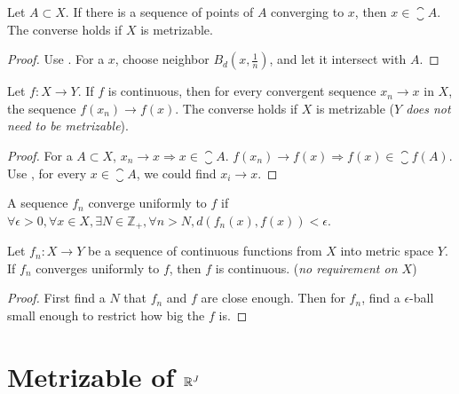 \begin{theorem}\label{sequence_lemma}
    Let $A \subset X$. If there is a sequence of points of $A$ converging to $x$, then $x \in \closure{A}$. The converse holds if $X$ is metrizable.
\end{theorem}
\begin{proof}
    Use . For a $x$, choose neighbor $B_d(x, \frac{1}{n})$, and let it intersect with $A$.
\end{proof}


\begin{theorem}
    Let $f: X \rightarrow Y$. If $f$ is continuous, then for every convergent sequence $x_n \rightarrow x$ in $X$, the sequence $f(x_n) \rightarrow f(x)$. The converse holds if $X$ is metrizable (\emph{$Y$ does not need to be metrizable}).
\end{theorem}
\begin{proof}
    For a $A \subset X$,  $x_n \rightarrow x \Rightarrow x \in \closure{A}$. $f(x_n) \rightarrow f(x) \Rightarrow f(x) \in \closure{f(A)}$. Use , for every $x \in \closure{A}$, we could find $x_i \rightarrow x$.
\end{proof}




\begin{definition}\label{converge_uniformly}
    A sequence $f_n$ converge uniformly to $f$ if $\forall \epsilon > 0,\forall x \in X, \exists N \in \mathbb{Z}_{+}, \forall n > N, d \left( f_n (x) , f(x) \right) < \epsilon$.
\end{definition}

\begin{theorem}
    Let $f_n: X \rightarrow Y$ be a sequence of continuous functions from $X$ into metric space $Y$. If $f_n$ converges uniformly to $f$, then $f$ is continuous. (\emph{no requirement on $X$})
\end{theorem}
\begin{proof}
    First find a $N$ that $f_n$ and $f$ are close enough. Then for $f_n$, find a $\epsilon$-ball small enough to restrict how big the $f$ is.
\end{proof}






\section{Metrizable of $\mathbb{R}^J$}


